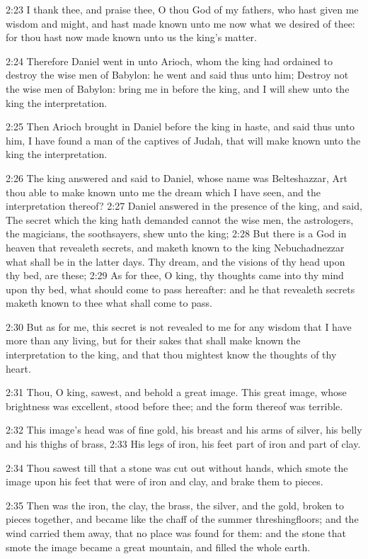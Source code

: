 2:23 I thank thee, and praise thee, O thou God of my fathers, who hast given me wisdom and might, and hast made known unto me now what we desired of thee: for thou hast now made known unto us the king's matter.

2:24 Therefore Daniel went in unto Arioch, whom the king had ordained to destroy the wise men of Babylon: he went and said thus unto him; Destroy not the wise men of Babylon: bring me in before the king, and I will shew unto the king the interpretation.

2:25 Then Arioch brought in Daniel before the king in haste, and said thus unto him, I have found a man of the captives of Judah, that will make known unto the king the interpretation.

2:26 The king answered and said to Daniel, whose name was Belteshazzar, Art thou able to make known unto me the dream which I have seen, and the interpretation thereof?  2:27 Daniel answered in the presence of the king, and said, The secret which the king hath demanded cannot the wise men, the astrologers, the magicians, the soothsayers, shew unto the king; 2:28 But there is a God in heaven that revealeth secrets, and maketh known to the king Nebuchadnezzar what shall be in the latter days. Thy dream, and the visions of thy head upon thy bed, are these; 2:29 As for thee, O king, thy thoughts came into thy mind upon thy bed, what should come to pass hereafter: and he that revealeth secrets maketh known to thee what shall come to pass.

2:30 But as for me, this secret is not revealed to me for any wisdom that I have more than any living, but for their sakes that shall make known the interpretation to the king, and that thou mightest know the thoughts of thy heart.

2:31 Thou, O king, sawest, and behold a great image. This great image, whose brightness was excellent, stood before thee; and the form thereof was terrible.

2:32 This image's head was of fine gold, his breast and his arms of silver, his belly and his thighs of brass, 2:33 His legs of iron, his feet part of iron and part of clay.

2:34 Thou sawest till that a stone was cut out without hands, which smote the image upon his feet that were of iron and clay, and brake them to pieces.

2:35 Then was the iron, the clay, the brass, the silver, and the gold, broken to pieces together, and became like the chaff of the summer threshingfloors; and the wind carried them away, that no place was found for them: and the stone that smote the image became a great mountain, and filled the whole earth.


